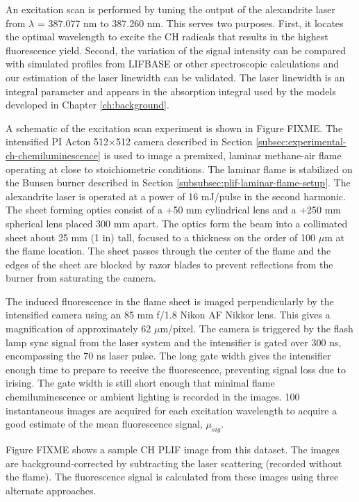 An excitation scan is performed by tuning the output of the alexandrite laser from \(\lambda\) = 387.077 nm to 387.260 nm.
This serves two purposes.
First, it locates the optimal wavelength to excite the CH radicals that results in the highest fluorescence yield.
Second, the variation of the signal intensity can be compared with simulated profiles from LIFBASE or other spectroscopic calculations and our estimation of the laser linewidth can be validated.
The laser linewidth is an integral parameter and appears in the absorption integral used by the models developed in Chapter \ref{ch:background}.

A schematic of the excitation scan experiment is shown in Figure FIXME.
The intensified PI Acton 512\(\times\)512 camera described in Section \ref{subsec:experimental-ch-chemiluminescence} is used to image a premixed, laminar methane-air flame operating at close to stoichiometric conditions.
The laminar flame is stabilized on the Bunsen burner described in Section \ref{subsubsec:plif-laminar-flame-setup}.
The alexandrite laser is operated at a power of 16 mJ/pulse in the second harmonic.
The sheet forming optics consist of a +50 mm cylindrical lens and a +250 mm spherical lens placed 300 mm apart.
The optics form the beam into a collimated sheet about 25 mm (1 in) tall, focused to a thickness on the order of 100 \(\mu\)m at the flame location.
The sheet passes through the center of the flame and the edges of the sheet are blocked by razor blades to prevent reflections from the burner from saturating the camera.

The induced fluorescence in the flame sheet is imaged perpendicularly by the intensified camera using an 85 mm f/1.8 Nikon AF Nikkor lens.
This gives a magnification of approximately 62 \(\mu\)m/pixel.
The camera is triggered by the flash lamp sync signal from the laser system and the intensifier is gated over 300 ns, encompassing the 70 ns laser pulse.
The long gate width gives the intensifier enough time to prepare to receive the fluorescence, preventing signal loss due to irising.
The gate width is still short enough that minimal flame chemiluminescence or ambient lighting is recorded in the images.
100 instantaneous images are acquired for each excitation wavelength to acquire a good estimate of the mean fluorescence signal, \(\mu_{sig}\).

Figure FIXME shows a sample CH PLIF image from this dataset.
The images are background-corrected by subtracting the laser scattering (recorded without the flame).
The fluorescence signal is calculated from these images using three alternate approaches.


